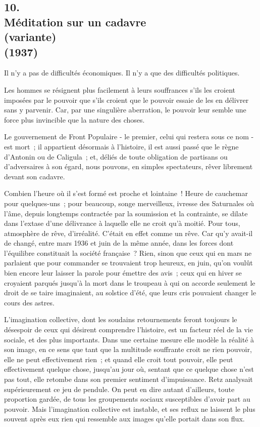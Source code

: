 \documentclass[french,twoside]{book} %
\begin{document}
\begin{center}
\noindent \centerline{}
\end{center}

\subsection[{10. Méditation sur un cadavre, (variante) (1937)}]{10. \\
Méditation sur un cadavre \\
(variante) \\
(1937)}
\noindent \par
Il n'y a pas de difficultés économiques. Il n'y a que des difficultés politiques.\par
Les hommes se résignent plus facilement à leurs souffrances s'ils les croient imposées par le pouvoir que s'ils croient que le pouvoir essaie de les en délivrer sans y parvenir. Car, par une singulière aberration, le pouvoir leur semble une force plus invincible que la nature des choses.\par
Le gouvernement de Front Populaire - le premier, celui qui restera sous ce nom - est mort ; il appartient désormais à l'histoire, il est aussi passé que le règne d'Antonin ou de Caligula ; et, déliés de toute obligation de partisans ou d'adversaires à son égard, nous pouvons, en simples spectateurs, rêver librement devant son cadavre.\par
Combien l'heure où il s'est formé est proche et lointaine ! Heure de cauchemar pour quelques-uns ; pour beaucoup, songe merveilleux, ivresse des Saturnales où l'âme, depuis longtemps contractée par la soumission et la contrainte, se dilate dans l'extase d'une délivrance à laquelle elle ne croit qu'à moitié. Pour tous, atmosphère de rêve, d'irréalité. C'était en effet comme un rêve. Car qu'y avait-il de changé, entre mars 1936 et juin de la même année, dans les forces dont l'équilibre constituait la société française ? Rien, sinon que ceux qui en mars ne parlaient que pour commander se trouvaient trop heureux, en juin, qu'on voulût bien encore leur laisser la parole pour émettre des avis ; ceux qui en hiver se croyaient parqués jusqu'à la mort dans le troupeau à qui on accorde seulement le droit de se taire imaginaient, au solstice d'été, que leurs cris pouvaient changer le cours des astres.\par
L'imagination collective, dont les soudains retournements feront toujours le désespoir de ceux qui désirent comprendre l'histoire, est un facteur réel de la vie sociale, et des plus importants. Dans une certaine mesure elle modèle la réalité à son image, en ce sens que tant que la multitude souffrante croit ne rien pouvoir, elle ne peut effectivement rien ; et quand elle croit tout pouvoir, elle peut effectivement quelque chose, jusqu'au jour où, sentant que ce quelque chose n'est pas tout, elle retombe dans son premier sentiment d'im­puissance. Retz analysait supérieurement ce jeu de pendule. On peut en dire autant d'ailleurs, toute proportion gardée, de tous les groupements sociaux susceptibles d'avoir part au pouvoir. Mais l'imagination collective est instable, et ses reflux ne laissent le plus souvent après eux rien qui ressemble aux images qu'elle portait dans son flux.\par
\end{document}
